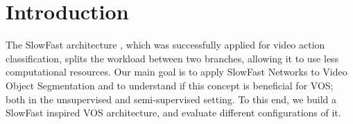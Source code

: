 \section{Introduction}
The SlowFast architecture \cite{slow_fast}, which was successfully applied for video action classification, splits the workload between two branches, allowing it to use less computational resources. 
Our main goal is to apply SlowFast Networks \cite{slow_fast}  to Video Object Segmentation and to understand if this concept is beneficial for VOS; both in the unsupervised and semi-supervised setting. To this end, we build a SlowFast inspired VOS architecture, and evaluate different configurations of it.